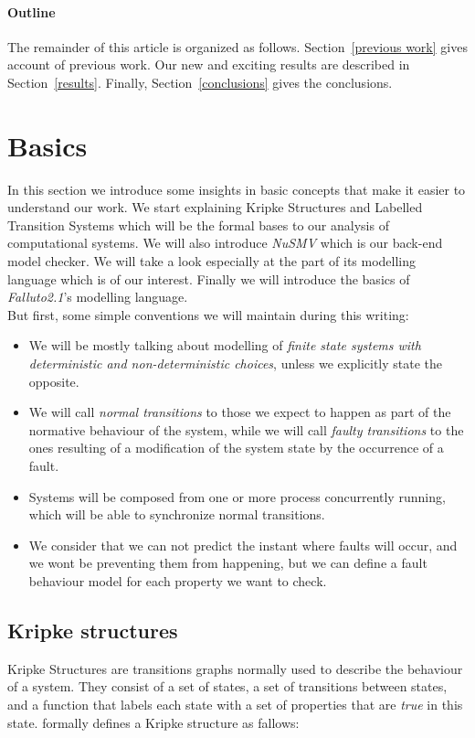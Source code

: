 \documentclass[12pt]{article}
\newcommand{\falluto}{\mbox{\textit{Falluto2.1}}}
\begin{document}
\paragraph{Outline}
The remainder of this article is organized as follows.
Section~\ref{previous work} gives account of previous work.
Our new and exciting results are described in Section~\ref{results}.
Finally, Section~\ref{conclusions} gives the conclusions.




\section{Basics}\label{basics}
In this section we introduce some insights in basic concepts that make it
easier to understand our work. We start explaining Kripke Structures and Labelled Transition Systems which will be the formal bases to our analysis of computational systems. We will also introduce \mbox{\textit{NuSMV}} which is our back-end model checker. We will take a look especially at the part of its modelling language which is of our interest. Finally we will introduce the basics of \falluto 's modelling language.\\
But first, some simple conventions we will maintain during this writing:
\begin{itemize}
\item We will be mostly talking about modelling of \textit{finite state systems with deterministic and non-deterministic choices}, unless we explicitly state the opposite.
\item We will call \textit{normal transitions} to those we expect to happen as part of the normative behaviour of the system, while we will call \textit{faulty transitions} to the ones resulting of a modification of the system state by the occurrence of a fault.
\item Systems will be composed from one or more process concurrently running, which will be able to synchronize normal transitions.
\item We consider that we can not predict the instant where faults will occur, and we wont be preventing them from happening, but we can define a fault behaviour model for each property we want to check.
\end{itemize}

\subsection{Kripke structures}\label{kripke} %
Kripke Structures are transitions graphs normally used to describe the behaviour of a system. They consist of a set of states, a set of transitions between states, and a function that labels each state with a set of properties that are \textit{true} in this state. \cite{clarke} formally defines a Kripke structure as fallows:\\
\end{document}

